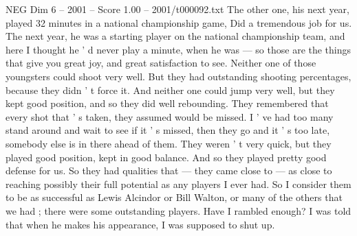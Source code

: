\begin{textsample}{NEG Dim 6 – 2001 – Score 1.00 – 2001/t000092.txt}
The other one, his next year, played 32 minutes in a national championship game, Did a tremendous job for us.
The next year, he was a starting player on the national championship team, and here I thought he ' d never play a minute, when he was — so those are the things that give you great joy, and great satisfaction to see.
Neither one of those youngsters could shoot very well.
But they had outstanding shooting percentages, because they didn ' t force it.
And neither one could jump very well, but they kept good position, and so they did well rebounding.
They remembered that every shot that ' s taken, they assumed would be missed.
I ' ve had too many stand around and wait to see if it ' s missed, then they go and it ' s too late, somebody else is in there ahead of them.
They weren ' t very quick, but they played good position, kept in good balance.
And so they played pretty good defense for us.
So they had qualities that — they came close to — as close to reaching possibly their full potential as any players I ever had.
So I consider them to be as successful as Lewis Alcindor or Bill Walton, or many of the others that we had ; there were some outstanding players.
Have I rambled enough?
I was told that when he makes his appearance, I was supposed to shut up.

\end{textsample}

